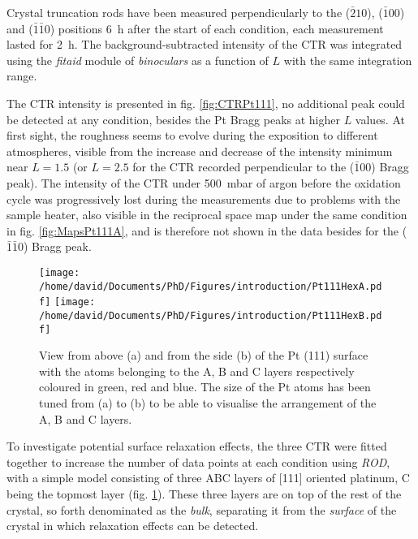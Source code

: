 Crystal truncation rods have been measured perpendicularly to the ($\bar{2}10$), ($\bar{1}00$) and ($\bar{1}\bar{1}0$) positions \qty{6}{\hour} after the start of each condition, each measurement lasted for \qty{2}{\hour}.
The background-subtracted intensity of the CTR was integrated using the \textit{fitaid} module of \textit{binoculars} as a function of $L$ with the same integration range.

The CTR intensity is presented in fig. \ref{fig:CTRPt111}, no additional peak could be detected at any condition, besides the Pt Bragg peaks at higher $L$ values.
At first sight, the roughness seems to evolve during the exposition to different atmospheres, visible from the increase and decrease of the  intensity minimum near $L=1.5$ (or $L=2.5$ for the CTR recorded perpendicular to the ($\bar{1}$00) Bragg peak).
The intensity of the CTR under \qty{500}{\milli\bar} of argon before the oxidation cycle was progressively lost during the measurements due to problems with the sample heater, also visible in the reciprocal space map under the same condition in fig. \ref{fig:MapsPt111A}, and is therefore not shown in the data besides for the ($\bar{1}\bar{1}$0) Bragg peak.

\begin{figure}[!htb]
    \centering
    \texttt{[image: /home/david/Documents/PhD/Figures/introduction/Pt111HexA.pdf]}
    \texttt{[image: /home/david/Documents/PhD/Figures/introduction/Pt111HexB.pdf]}
    \caption{
        View from above (a) and from the side (b) of the Pt (111) surface with the atoms belonging to the A, B and C layers respectively coloured in green, red and blue.
        The size of the Pt atoms has been tuned from (a) to (b) to be able to visualise the arrangement of the A, B and C layers.
    }
    \label{fig:Pt111StructureSideAndTop}
\end{figure}

To investigate potential surface relaxation effects, the three CTR were fitted together to increase the number of data points at each condition using \textit{ROD}, with a simple model consisting of three ABC layers of [111] oriented platinum, C being the topmost layer (fig. \ref{fig:Pt111StructureSideAndTop}).
These three layers are on top of the rest of the crystal, so forth denominated as the \textit{bulk}, separating it from the \textit{surface} of the crystal in which relaxation effects can be detected.

